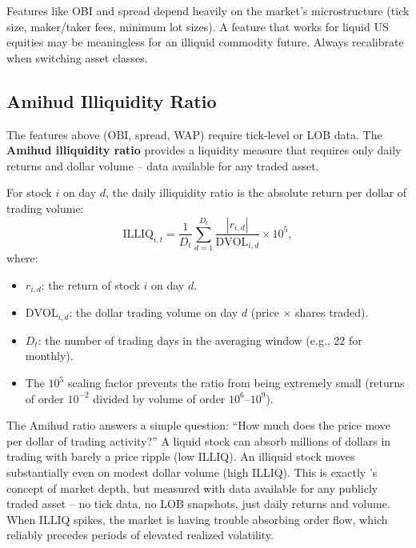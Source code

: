 \begin{warning}
Features like OBI and spread depend heavily on the market's microstructure (tick size, maker/taker fees, minimum lot sizes).
A feature that works for liquid US equities may be meaningless for an illiquid commodity future.
Always recalibrate when switching asset classes.
\end{warning}

\subsection{Amihud Illiquidity Ratio}\label{sec:feat-amihud}

The features above (OBI, spread, WAP) require tick-level or LOB data.
The \textbf{Amihud illiquidity ratio} \citep{Amihud2002} provides a liquidity measure that requires only daily returns and dollar volume -- data available for any traded asset.

\begin{definition}
\label{def:amihud}
For stock $i$ on day $d$, the daily illiquidity ratio is the absolute return per dollar of trading volume:
\begin{equation}\label{eq:amihud}
\text{ILLIQ}_{i,t} = \frac{1}{D_t}\sum_{d=1}^{D_t} \frac{|r_{i,d}|}{\text{DVOL}_{i,d}} \times 10^5,
\end{equation}
where:
\begin{itemize}[nosep]
  \item $r_{i,d}$: the return of stock $i$ on day $d$.
  \item $\text{DVOL}_{i,d}$: the dollar trading volume on day $d$ (price $\times$ shares traded).
  \item $D_t$: the number of trading days in the averaging window (e.g., 22 for monthly).
  \item The $10^5$ scaling factor prevents the ratio from being extremely small (returns of order $10^{-2}$ divided by volume of order $10^{6}$--$10^{9}$).
\end{itemize}
\end{definition}

\begin{intuition}
The Amihud ratio answers a simple question: ``How much does the price move per dollar of trading activity?''
A liquid stock can absorb millions of dollars in trading with barely a price ripple (low ILLIQ).
An illiquid stock moves substantially even on modest dollar volume (high ILLIQ).
This is exactly \citeauthor{Kyle1985}'s concept of market depth, but measured with data available for any publicly traded asset -- no tick data, no LOB snapshots, just daily returns and volume.
When ILLIQ spikes, the market is having trouble absorbing order flow, which reliably precedes periods of elevated realized volatility.
\end{intuition}

